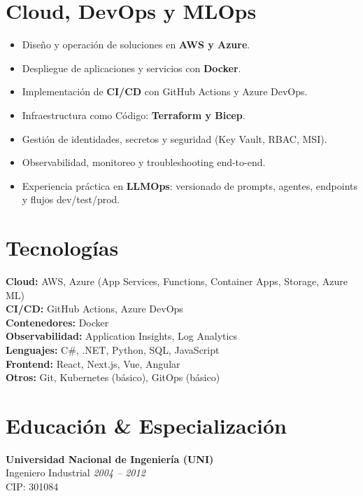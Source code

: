 \documentclass[11pt,a4paper]{article}
\begin{document}
\vspace{6pt}

\section*{Cloud, DevOps y MLOps}

\begin{itemize}[leftmargin=*]
  \item Diseño y operación de soluciones en \textbf{AWS y Azure}.
  \item Despliegue de aplicaciones y servicios con \textbf{Docker}.
  \item Implementación de \textbf{CI/CD} con GitHub Actions y Azure DevOps.
  \item Infraestructura como Código: \textbf{Terraform y Bicep}.
  \item Gestión de identidades, secretos y seguridad (Key Vault, RBAC, MSI).
  \item Observabilidad, monitoreo y troubleshooting end-to-end.
  \item Experiencia práctica en \textbf{LLMOps}: versionado de prompts, agentes, endpoints y flujos dev/test/prod.
\end{itemize}

\vspace{6pt}

\section*{Tecnologías}

\textbf{Cloud:} AWS, Azure (App Services, Functions, Container Apps, Storage, Azure ML)\\
\textbf{CI/CD:} GitHub Actions, Azure DevOps\\
\textbf{Contenedores:} Docker\\
\textbf{Observabilidad:} Application Insights, Log Analytics\\
\textbf{Lenguajes:} C\#, .NET, Python, SQL, JavaScript\\
\textbf{Frontend:} React, Next.js, Vue, Angular\\
\textbf{Otros:} Git, Kubernetes (básico), GitOps (básico)

\vspace{6pt}
\section*{Educación \& Especialización}

\textbf{Universidad Nacional de Ingeniería (UNI)}\\
Ingeniero Industrial \hfill \textit{2004 – 2012}\\
CIP: 301084
\end{document}
